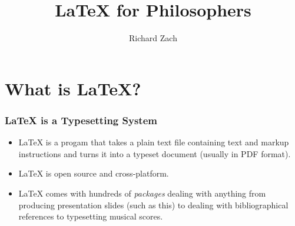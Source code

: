 
\usepackage{hyperref}

\newenvironment{articleonly}{\mode<article>}{\mode<all>}


\title{\LaTeX{} for Philosophers}

\author{Richard Zach}



\frame{\maketitle}

  \frame{
\tableofcontents[ 
    currentsubsection, 
    hideothersubsections, 
    sectionstyle=show/hide, 
    subsectionstyle=show/shaded, 
    ] }

\section{What is \LaTeX?}

\begin{frame}
  \frametitle{\LaTeX{} is a Typesetting System}

\begin{itemize}
\item \LaTeX{} is a progam that takes a plain text file containing
  text and markup instructions and turns it into a typeset document
  (usually in PDF format).
\item \LaTeX{} is open source and cross-platform.
\item \LaTeX{} comes with hundreds of \emph{packages} dealing with
  anything from producing presentation slides (such as this) to
  dealing with bibliographical references to typesetting musical
  scores.
\end{itemize}
\end{frame}

